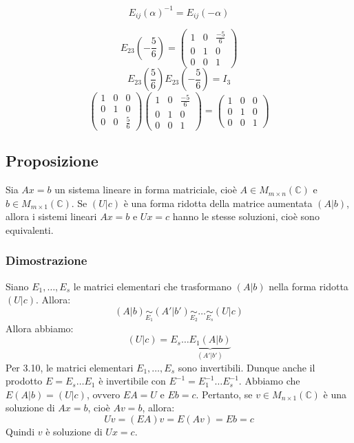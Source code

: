 \documentclass[a4paper]{article}
\theoremstyle{break}
\theoremstyle{break}
\theoremstyle{break}
\theoremstyle{break}
\begin{document}
\[
  E_{ij}(\alpha)^{-1} = E_{ij}(-\alpha)
\] 
\begin{figure}[H]
  \begin{example}
    \[
      E_{23}(-\frac{5}{6}) = \begin{pmatrix} 
        1 & 0 & \frac{-5}{6}\\
        0 & 1 & 0\\
        0 & 0 & 1
      \end{pmatrix}
    \] 
    \[
      E_{23}(\frac{5}{6})E_{23}(-\frac{5}{6}) = I_3
    \] 
    \[
      \begin{pmatrix} 
        1 & 0 & 0\\
        0 & 1 & 0\\
        0 & 0 & \frac{5}{6}
      \end{pmatrix}
      \begin{pmatrix} 
        1 & 0 & \frac{-5}{6}\\
        0 & 1 & 0\\
        0 & 0 & 1
      \end{pmatrix}
      =
      \begin{pmatrix} 
        1 & 0 & 0\\
        0 & 1 & 0\\
        0 & 0 & 1
      \end{pmatrix}
    \] 
  \end{example}
\end{figure}

\subsection{Proposizione}
Sia \( Ax = b \) un sistema lineare in forma matriciale, cioè \( A \in M_{m \times n}(\mathbb{C}) \) 
e \( b \in M_{m \times 1}(\mathbb{C}) \). Se \( (U|c) \) è una forma ridotta della matrice
aumentata \( (A|b) \), allora i sistemi lineari \( Ax = b \) e \( Ux = c \) hanno le
stesse soluzioni, cioè sono equivalenti.

\subsubsection{Dimostrazione}
Siano \( E_1, \ldots, E_s \) le matrici elementari che trasformano \( (A|b) \) nella forma
ridotta \( (U|c) \). Allora:
\[
  (A|b) \underset{E_1}{\sim} (A'|b') \underset{E_2}{\sim} \ldots \underset{E_s}{\sim} (U|c)
\] 
Allora abbiamo:
\[
  (U|c) = E_s \ldots \underbrace{E_1(A|b)}_{(A'|b')}
\] 
Per 3.10, le matrici elementari \( E_1, \ldots, E_s \) sono invertibili. Dunque anche il
prodotto \( E = E_s \ldots E_1 \) è invertibile con \( E^{-1} = E_1^{-1} \ldots E_s^{-1} \).
Abbiamo che \( E(A|b) = (U|c) \), ovvero \( EA = U \) e \( Eb = c \).
Pertanto, se \( v \in M_{n \times 1}(\mathbb{C}) \) è una soluzione di \( Ax = b \),
cioè \( Av = b \), allora:
\[
  Uv = (EA)v = E(Av) = Eb = c
\] 
Quindi \( v \) è soluzione di \( Ux = c \).
\end{document}
